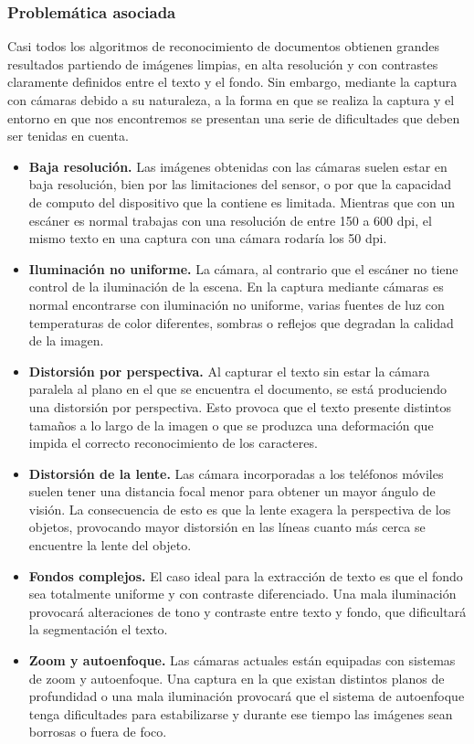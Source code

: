 \subsubsection{Problemática asociada}
Casi todos los algoritmos de reconocimiento de documentos obtienen grandes resultados partiendo de imágenes limpias, en alta resolución y con contrastes claramente definidos entre el texto y el fondo. Sin embargo, mediante la captura con cámaras debido a su naturaleza, a la forma en que se realiza la captura y el entorno en que nos encontremos se presentan una serie de dificultades que deben ser tenidas en cuenta.  
\begin{itemize}
\item\textbf{Baja resolución.} Las imágenes obtenidas con las cámaras suelen estar en baja resolución, bien por las limitaciones del sensor, o por que la capacidad de computo del dispositivo que la contiene es limitada. Mientras que con un escáner es normal trabajas con una resolución de entre 150 a 600 dpi, el mismo texto en una captura con una cámara rodaría los 50 dpi.
\item\textbf{Iluminación no uniforme.} La cámara, al contrario que el escáner no tiene control de la iluminación de la escena. En la captura mediante cámaras es normal encontrarse con iluminación no uniforme, varias fuentes de luz con temperaturas de color diferentes, sombras o reflejos que degradan la calidad de la imagen.
\item\textbf{Distorsión por perspectiva.} Al capturar el texto sin estar la cámara paralela al plano en el que se encuentra el documento, se está produciendo una distorsión por perspectiva. Esto provoca que el texto presente distintos tamaños a lo largo de la imagen o que se produzca una deformación que impida el correcto reconocimiento de los caracteres. 
\item\textbf{Distorsión de la lente.} Las cámara incorporadas a los teléfonos móviles suelen tener una distancia focal menor para obtener un mayor ángulo de visión. La consecuencia de esto es que la lente exagera la perspectiva de los objetos, provocando mayor distorsión en las líneas cuanto más cerca se encuentre la lente del objeto.
\item\textbf{Fondos complejos.} El caso ideal para la extracción de texto es que el fondo sea totalmente uniforme y con contraste diferenciado. Una mala iluminación provocará alteraciones de tono y contraste entre texto y fondo, que dificultará la segmentación el texto. 
\item\textbf{Zoom y autoenfoque.} Las cámaras actuales están equipadas con sistemas de zoom y autoenfoque. Una captura en la que existan distintos planos de profundidad o una mala iluminación provocará que el sistema de autoenfoque tenga dificultades para estabilizarse y durante ese tiempo las imágenes sean borrosas o fuera de foco.

\end{itemize}
